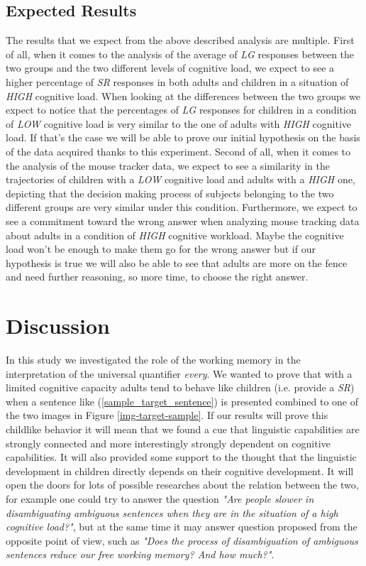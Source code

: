 \documentclass[10pt, a4]{article}
\begin{document}
\subsection{Expected Results}
The results that we expect from the above described analysis are multiple. First of all, when it comes to the analysis of the
average of \textit{LG} responses between the two groups and the two different levels of cognitive load, we expect to see a higher
percentage of \textit{SR} responses in both adults and children in a situation of \textit{HIGH} cognitive load. When looking at
the differences between the two groups we expect to notice that the percentages of \textit{LG} responses for children in a condition
of \textit{LOW} cognitive load is very similar to the one of adults with \textit{HIGH} cognitive load. If that's the case
we will be able to prove our initial hypothesis on the basis of the data acquired thanks to this experiment.
Second of all, when it comes to the analysis of the mouse tracker data, we expect to see a similarity in the trajectories
of children with a \textit{LOW} cognitive load and adults with a \textit{HIGH} one, depicting that the decision making process
of subjects belonging to the two different groups are very similar under this condition. Furthermore, we expect to see a commitment
toward the wrong answer when analyzing mouse tracking data about adults in a condition of \textit{HIGH} cognitive workload. Maybe
the cognitive load won't be enough to make them go for the wrong answer but if our hypothesis is true we will also be able to see that
adults are more on the fence and need further reasoning, so more time, to choose the right answer.

\section{Discussion}
In this study we investigated the role of the working memory in the interpretation of the universal quantifier \textit{every}.
We wanted to prove that with a limited cognitive capacity adults tend to behave like children (i.e. provide a \textit{SR})
when a sentence like (\ref{sample_target_sentence}) is presented combined to one of the two images in Figure \ref{img-target-sample}.
If our results will prove this childlike behavior it will mean that we found a cue that linguistic capabilities are strongly connected
and more interestingly strongly dependent on cognitive capabilities. It will also provided some support to the thought that
the linguistic development in children directly depends on their cognitive development. It will open the doors for lots of possible
researches about the relation between the two, for example one could try to answer the question \textit{"Are people slower in disambiguating
ambiguous sentences when they are in the situation of a high cognitive load?"}, but at the same time it may answer question proposed
from the opposite point of view, such as \textit{"Does the process of disambiguation of ambiguous sentences reduce our free working memory?
And how much?"}.



\setlength{\bibhang}{.125in}
\setlength{\bibindent}{-\bibhang}

\vfill
\pagebreak


\end{document}
